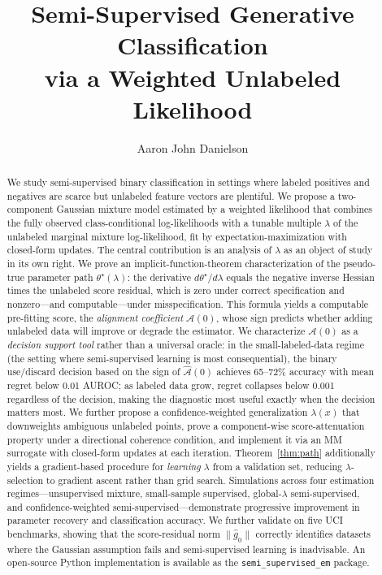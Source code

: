 \documentclass[11pt]{article}
\title{Semi-Supervised Generative Classification\\
       via a Weighted Unlabeled Likelihood}
\author{Aaron John Danielson}
\date{}
\theoremstyle{definition}
\begin{document}
\maketitle

\begin{abstract}
We study semi-supervised binary classification in settings where labeled positives
and negatives are scarce but unlabeled feature vectors are plentiful.
We propose a two-component Gaussian mixture model estimated by a weighted
likelihood that combines the fully observed class-conditional log-likelihoods
with a tunable multiple \(\lambda\) of the unlabeled marginal mixture
log-likelihood, fit by expectation-maximization with closed-form updates.
The central contribution is an analysis of \(\lambda\) as an object of study
in its own right.
We prove an implicit-function-theorem characterization of the pseudo-true
parameter path \(\theta^\star(\lambda)\): the derivative \(d\theta^\star/d\lambda\)
equals the negative inverse Hessian times the unlabeled score residual,
which is zero under correct specification and nonzero---and computable---under
misspecification.
This formula yields a computable pre-fitting score, the \emph{alignment
coefficient} \(\mathcal{A}(0)\), whose sign predicts whether adding unlabeled
data will improve or degrade the estimator.
We characterize \(\mathcal{A}(0)\) as a \emph{decision support tool} rather
than a universal oracle: in the small-labeled-data regime
(the setting where semi-supervised learning is most consequential),
the binary use/discard decision based on the sign of \(\hat{\mathcal{A}}(0)\)
achieves 65--72\% accuracy with mean regret below 0.01 AUROC;
as labeled data grow, regret collapses below 0.001 regardless of the decision,
making the diagnostic most useful exactly when the decision matters most.
We further propose a confidence-weighted generalization \(\lambda(x)\) that
downweights ambiguous unlabeled points, prove a component-wise score-attenuation
property under a directional coherence condition, and implement it via an
MM surrogate with closed-form updates at each iteration.
Theorem~\ref{thm:path} additionally yields a gradient-based procedure for
\emph{learning} \(\lambda\) from a validation set, reducing \(\lambda\)-selection
to gradient ascent rather than grid search.
Simulations across four estimation regimes---unsupervised mixture, small-sample
supervised, global-\(\lambda\) semi-supervised, and confidence-weighted
semi-supervised---demonstrate progressive improvement in parameter recovery
and classification accuracy.
We further validate on five UCI benchmarks, showing that the score-residual
norm \(\|\hat{g}_0\|\) correctly identifies datasets where the Gaussian
assumption fails and semi-supervised learning is inadvisable.
An open-source Python implementation is available as the
\texttt{semi\_supervised\_em} package.
\end{abstract}
\end{document}
